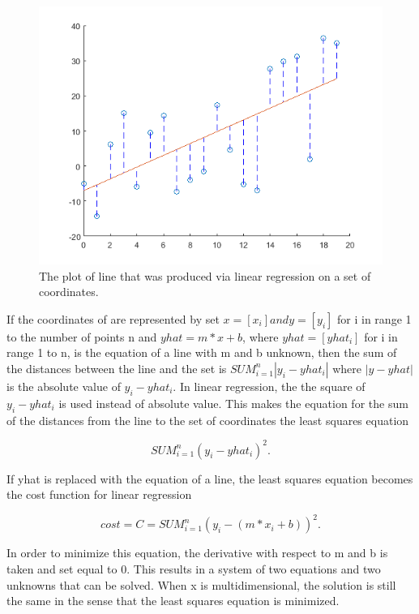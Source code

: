 \documentclass[12pt, oneside]{book}
\begin{document}
\begin{figure}[H]
	\centering
	\includegraphics[]{linear.png}
	\caption{The plot of line that was produced via linear regression on a set of coordinates.}
	\label{fig:linear}
\end{figure}

If the coordinates of are represented by set \(x = [x_i] and y = [y_i] \) for i in range 1 to the number of points n and \(yhat = m*x + b\), where \(yhat = [yhat_i]\)  for i in range 1 to n, is the equation of a line with m and b unknown, then the sum of the distances between the line and the set is \( SUM_{i=1}^{n}|y_{i}-yhat_{i}| \) where \(|y-yhat|\) is the absolute value of \(y_{i}-yhat_{i}\). In linear regression, the the square of \(y_{i}-yhat_{i}\) is used instead of absolute value. This makes the equation for the sum of the distances from the line to the set of coordinates the least squares equation \cite{lazyprogrammer.me_data_nodate-1}

\begin{equation}
SUM_{i=1}^{n}(y_{i}-yhat_{i})^{2}.
\end{equation}

If yhat is replaced with the equation of a line, the least squares equation becomes the cost function for linear regression \cite{lazyprogrammer.me_data_nodate-1}

\begin{equation}
cost=C=SUM_{i=1}^{n}(y_{i}-(m*x_{i} + b))^{2}.
\end{equation}


In order to minimize this equation, the derivative with respect to m and b is taken and set equal to 0. This results in a system of two equations and two unknowns that can be solved. When x is multidimensional, the solution is still the same in the sense that the least squares equation is minimized. \cite{lazyprogrammer.me_data_nodate-1}
\end{document}
